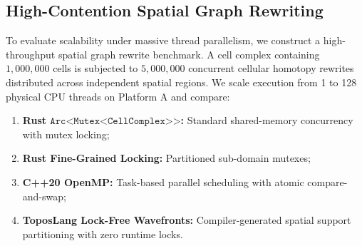 \subsection{High-Contention Spatial Graph Rewriting}
To evaluate scalability under massive thread parallelism, we construct a high-throughput spatial graph rewrite benchmark. A cell complex containing $1,000,000$ cells is subjected to $5,000,000$ concurrent cellular homotopy rewrites distributed across independent spatial regions. We scale execution from 1 to 128 physical CPU threads on Platform A and compare:
\begin{enumerate}
    \item \textbf{Rust $\texttt{Arc<Mutex<CellComplex>>}$:} Standard shared-memory concurrency with mutex locking;
    \item \textbf{Rust Fine-Grained Locking:} Partitioned sub-domain mutexes;
    \item \textbf{C++20 OpenMP:} Task-based parallel scheduling with atomic compare-and-swap;
    \item \textbf{ToposLang Lock-Free Wavefronts:} Compiler-generated spatial support partitioning with zero runtime locks.
\end{enumerate}

